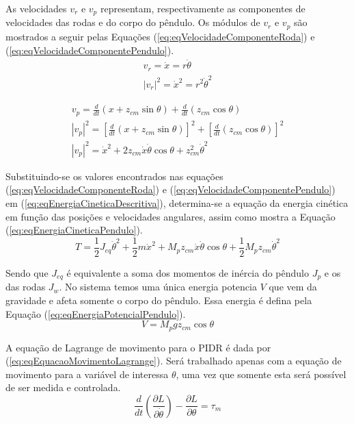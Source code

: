 As velocidades $\textit{v}_{r}$ e $\textit{v}_{p}$ representam, respectivamente as componentes de velocidades das rodas e do corpo do pêndulo. Os módulos de $\textit{v}_{r}$ e $\textit{v}_{p}$ são mostrados a seguir pelas Equações (\ref{eq:eqVelocidadeComponenteRoda}) e (\ref{eq:eqVelocidadeComponentePendulo}).
\begin{gather}
    v_r = \dot{x} = r\dot{\theta}
    \nonumber\\[1ex]
    |v_r|^2 = \dot{x}^2 = r^2\dot{\theta}^2\label{eq:eqVelocidadeComponenteRoda}
\end{gather}

\begin{gather}
    v_p =  \frac{d}{dt}(x + z_{cm}\sin{\theta}) + \frac{d}{dt}(z_{cm}\cos{\theta})
    \nonumber\\[1ex]
    |v_p|^2 = \left[\frac{d}{dt}(x + z_{cm}\sin{\theta})\right]^2  +  \left[\frac{d}{dt}(z_{cm}\cos{\theta})\right]^2 
    \nonumber\\[1ex]
    |v_p|^2 = \dot{x}^2 + 2z_{cm}\dot{x}\dot{\theta}\cos{\theta} + z_{cm}^2\dot{\theta}^2 \label{eq:eqVelocidadeComponentePendulo}
\end{gather}

Substituindo-se os valores encontrados nas equações (\ref{eq:eqVelocidadeComponenteRoda}) e (\ref{eq:eqVelocidadeComponentePendulo}) em (\ref{eq:eqEnergiaCineticaDescritiva}), determina-se a equação da energia cinética em função das posições e velocidades angulares, assim como mostra a Equação (\ref{eq:eqEnergiaCineticaPendulo}).
\begin{equation}\label{eq:eqEnergiaCineticaPendulo}
    T = \frac{1}{2}J_{eq}\dot{\theta}^2 + \frac{1}{2}m\dot{x}^2 + M_pz_{cm}\dot{x}\dot{\theta}\cos{\theta} + \frac{1}{2}M_pz_{cm}\dot{\theta}^2
\end{equation}

Sendo que $J_{eq}$ é equivalente a soma dos momentos de inércia do pêndulo $J_p$ e os das rodas $J_w$. No sistema temos uma única energia potencia $V$ que vem da gravidade e afeta somente o corpo do pêndulo. Essa energia é defina pela Equação (\ref{eq:eqEnergiaPotencialPendulo}).
\begin{equation}\label{eq:eqEnergiaPotencialPendulo}
    V = M_pgz_{cm}\cos{\theta}
\end{equation}

A equação de Lagrange de movimento para o PIDR é dada por (\ref{eq:eqEquacaoMovimentoLagrange}). Será trabalhado apenas com a equação de movimento para a variável de interessa $\theta$, uma vez que somente esta será possível de ser medida e controlada.
\begin{equation}\label{eq:eqEquacaoMovimentoLagrange}
    \frac{d}{dt}\left(\dfrac{\partial L}{\partial\dot{\theta}}\right) - \dfrac{\partial L}{\partial\theta} = \tau_{m}
\end{equation}

